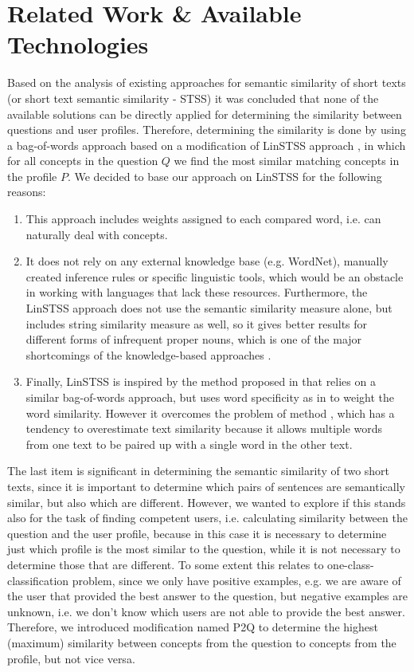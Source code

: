\documentclass[conference]{IEEEtran}
\begin{document}
\section{Related Work \& Available Technologies}
\label{sec:relatedwork}
Based on the analysis of existing approaches for semantic similarity of short texts (or short text semantic similarity - STSS) it was concluded that none of the available solutions can be directly applied for determining the similarity between questions and user profiles. Therefore, determining the similarity is done by using a bag-of-words approach based on a modification of LinSTSS approach \cite{bib:LinSTSS}, in which for all concepts in the question $Q$ we find the most similar matching concepts in the profile $P$. We decided to base our approach on LinSTSS for the following reasons:
\begin{enumerate}
	\item This approach includes weights assigned to each compared word, i.e. can naturally deal with concepts.
	\item It does not rely on any external knowledge base (e.g. WordNet), manually created inference rules or specific linguistic tools, which would be an obstacle in working with languages that lack these resources. Furthermore, the LinSTSS approach does not use the semantic similarity measure alone, but includes string similarity measure as well, so it gives better results for different forms of infrequent proper nouns, which is one of the major shortcomings of the knowledge-based approaches \cite{bib:JITA}.
	\item Finally, LinSTSS is inspired by the method proposed in \cite{bib:1} that relies on a similar bag-of-words approach, but uses word specificity as in \cite{bib:2} to weight the word similarity. However it overcomes the problem of method \cite{bib:2}, which has a tendency to overestimate text similarity because it allows multiple words from one text to be paired up with a single word in the other text.
\end{enumerate}	
The last item is significant in determining the semantic similarity of two short texts, since it is important to determine which pairs of sentences are semantically similar, but also which are different. However, we wanted to explore if this stands also for the task of finding competent users, i.e. calculating similarity between the question and the user profile, because in this case it is necessary to determine just which profile is the most similar to the question, while it is not necessary to determine those that are different. To some extent this relates to one-class-classification problem, since we only have positive examples, e.g. we are aware of the user that provided the best answer to the question, but negative examples are unknown, i.e. we don’t know which users are not able to provide the best answer. Therefore, we introduced modification named P2Q to determine the highest (maximum) similarity between concepts from the question to concepts from the profile, but not vice versa.
\end{document}

